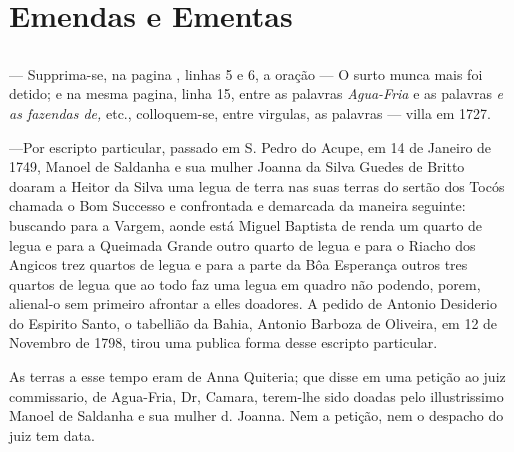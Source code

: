 \chapter{Emendas e Ementas}
\section*{}
— Supprima-se, na pagina \pageref{surto}, linhas 5 e 6, a oração — O surto munca mais foi detido; e na mesma pagina, linha 15, entre as palavras \textit{Agua-Fria} e as palavras \textit{e as fazendas de,} etc., colloquem-se, entre virgulas, as palavras — villa em 1727.

—Por escripto particular, passado em S. Pedro do Acupe, em 14 de Janeiro de 1749, Manoel de Saldanha e sua mulher Joanna da Silva Guedes de Britto doaram a Heitor da Silva uma legua de terra nas suas terras do sertão dos Tocós chamada o Bom Successo e confrontada e demarcada da maneira seguinte:
buscando para a Vargem, aonde está Miguel Baptista de renda um quarto de legua e para a Queimada Grande outro quarto de legua e para o Riacho dos Angicos trez quartos de legua e para a parte da Bôa Esperança outros tres
quartos de legua que ao todo faz uma legua em quadro não podendo, porem, alienal-o sem primeiro afrontar a elles doadores. A pedido de Antonio Desiderio do Espirito Santo, o tabellião da Bahia, Antonio Barboza de Oliveira, em 12 de Novembro de 1798, tirou uma publica forma desse escripto particular.

As terras a esse tempo eram de Anna Quiteria; que disse em uma petição ao juiz commissario, de Agua-Fria, Dr, Camara, terem-lhe sido doadas pelo illustrissimo Manoel de Saldanha e sua mulher d. Joanna. Nem a petição, nem o despacho do juiz tem data.

